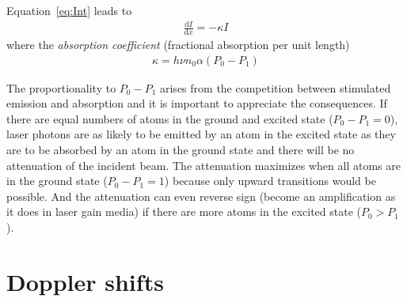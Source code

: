Equation~\ref{eq:Int} leads to
\begin{align}
    \frac{ \mathrm{d}I }{ \mathrm{d}x } = -\kappa I
\end{align}
where the \textit{absorption coefficient} (fractional absorption per unit length)
\begin{align}\label{eq:kappa}
    \kappa = h\nu n_0 \alpha (P_0-P_1)
\end{align}

The proportionality to \(P_0-P_1 \) arises from the competition between stimulated emission and absorption
and it is important to appreciate the consequences. If there are equal numbers of atoms in the ground and
excited state (\(P_0-P_1=0\)), laser photons are as likely to be emitted by an atom in the excited state as
they are to be absorbed by an atom in the ground state and there will be no attenuation of the incident beam.
The attenuation maximizes when all atoms are in the ground state (\(P_0-P_1=1\)) because only upward 
transitions would be possible. And the attenuation can even reverse sign (become an amplification as it does
in laser gain media) if there are more atoms in the excited state (\(P_0>P_1\)).

\section{Doppler shifts}  %

